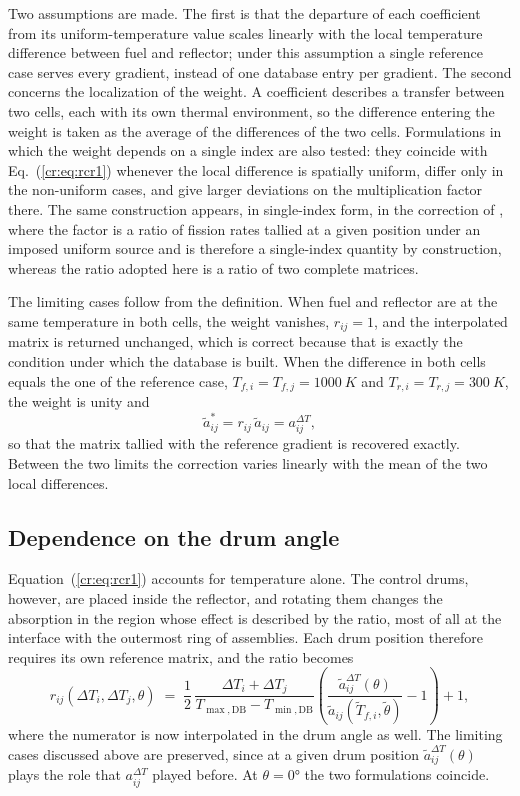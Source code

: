 Two assumptions are made. The first is that the departure of each coefficient
from its uniform-temperature value scales linearly with the local temperature
difference between fuel and reflector; under this assumption a single
reference case serves every gradient, instead of one database entry per
gradient. The
second concerns the localization of the weight. A coefficient describes a
transfer between two cells, each with its own thermal environment, so the
difference entering the weight is taken as the average of the differences of
the two cells. Formulations in which the weight depends on a single index are
also tested: they coincide with Eq.~(\ref{cr:eq:rcr1}) whenever the local
difference is spatially uniform, differ only in the non-uniform cases, and give
larger deviations on the multiplication factor there. The same construction
appears, in single-index form, in the correction of \citet{HeANE2019}, where
the factor is a ratio of fission rates tallied at a given position under an
imposed uniform source and is therefore a single-index quantity by
construction, whereas the ratio adopted here is a ratio of two complete
matrices.

The limiting cases follow from the definition. When fuel and reflector are at
the same temperature in both cells, the weight vanishes, $r_{ij}=1$, and the
interpolated matrix is returned unchanged, which is correct because that is
exactly the condition under which the database is built. When the difference
in both cells equals the one of the reference case,
$T_{f,i}=T_{f,j}=\SI{1000}{K}$ and $T_{r,i}=T_{r,j}=\SI{300}{K}$, the weight is
unity and
%
\begin{equation}
  \tilde a^{*}_{ij} = r_{ij}\,\tilde a_{ij} = a^{\Delta T}_{ij},
  \label{cr:eq:rcr-limit}
\end{equation}
%
so that the matrix tallied with the reference gradient is recovered exactly.
Between the two limits the correction varies linearly with the mean of the two
local differences.

\subsection{Dependence on the drum angle}

Equation~(\ref{cr:eq:rcr1}) accounts for temperature alone. The control drums,
however, are placed inside the reflector, and rotating them changes the
absorption in the region whose effect is described by the ratio, most of all at
the interface
with the outermost ring of assemblies. Each drum position therefore requires
its own reference matrix, and the ratio becomes
%
\begin{equation}
  r_{ij}(\Delta T_i,\Delta T_j,\theta) \;=\;
  \frac{1}{2}\,\frac{\Delta T_i + \Delta T_j}{T_{\max,\mathrm{DB}} - T_{\min,\mathrm{DB}}}
  \left( \frac{\tilde a^{\Delta T}_{ij}(\theta)}{\tilde a_{ij}(\tilde T_{f,i},\tilde\theta)} - 1 \right) + 1 ,
  \label{cr:eq:rcr2}
\end{equation}
%
where the numerator is now interpolated in the drum angle as well. The limiting
cases discussed above are preserved, since at a given drum
position $\tilde a^{\Delta T}_{ij}(\theta)$ plays the role that
$a^{\Delta T}_{ij}$ played before. At $\theta=\ang{0}$ the two formulations
coincide.

